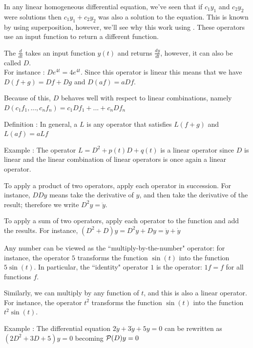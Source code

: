 \documentclass[11pt, openright]{book}
\begin{document}
In any linear homogeneous differential equation, we've seen that if $c_1y_1$ and $c_2y_2$ were solutions then $c_1y_1+c_2y_2$ was also a solution to the equation. This is known by using superposition, however, we'll see why this work using . These operators use an input function to return a different function.

The  $\frac{d}{dt}$ takes an input function $y(t)$ and returns $\frac{dy}{dt}$, however, it can also be called $D$.\\ For instance : $De^{4t}=4e^{4t}$. Since this operator is linear this means that we have $D(f+g)=Df+Dg$ and $D(af)=aDf$.

Because of this, $D$ behaves well with respect to linear combinations, namely $D(c_1f_1,...,c_nf_n)=c_1Df_1+...+c_nDf_n$

\begin{dent}{Definition :}
    In general, a  $L$ is any operator that satisfies $L(f+g)$ and $L(af)=aLf$
\end{dent}
\begin{dent}{Example :}
    The operator $L=D^2+p(t)D+q(t)$ is a linear operator since $D$ is linear and the linear combination of linear operators is once again a linear operator.
\end{dent}

To apply a product of two operators, apply each operator in succession. For instance, $DDy$ means take the derivative of $y$, and then take the derivative of the result; therefore we write $D^2y=\ddot{y}$.

To apply a sum of two operators, apply each operator to the function and add the results. For instance, $(D^2+D)y=D^2y+Dy=\ddot{y}+\dot{y}$

Any number can be viewed as the “multiply-by-the-number" operator: for instance, the operator $5$ transforms the function $\sin(t)$ into the function $5\sin(t)$. In particular, the “identity" operator $1$ is the operator: $1f=f$ for all functions $f$.

Similarly, we can multiply by any function of $t$, and this is also a linear operator. For instance, the operator $t^2$ transforms the function $\sin(t)$ into the function $t^2\sin(t)$.

\begin{dent}{Example :}
    The differential equation $2\ddot{y}+3\dot{y}+5y=0$ can be rewritten as $(2D^2+3D+5)y=0$ becoming $\P(D)y=0$
\end{dent}
\end{document}
